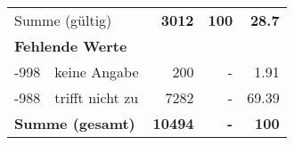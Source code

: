 \begin{longtable}{lXrrr}
     \midrule
     \multicolumn{2}{l}{Summe (gültig)} &
       \textbf{\num{3012}} &
     \textbf{\num{100}} &
       \textbf{\num[round-mode=places,round-precision=2]{28.7}} \\
     \multicolumn{5}{l}{\textbf{Fehlende Werte}}\\
       -998 &
       keine Angabe &
         \num{200} &
        - &
         \num[round-mode=places,round-precision=2]{1.91} \\
       -988 &
       trifft nicht zu &
         \num{7282} &
        - &
         \num[round-mode=places,round-precision=2]{69.39} \\
     \midrule
     \multicolumn{2}{l}{\textbf{Summe (gesamt)}} &
          \textbf{\num{10494}} &
        \textbf{-} &
        \textbf{\num{100}} \\
     \bottomrule
     \end{longtable}
     
